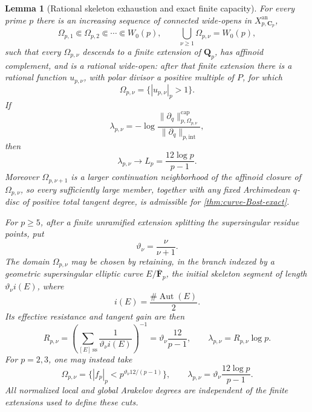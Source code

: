 \documentclass[11pt]{article}
\newtheorem{lemma}[lemma]{Lemma}
\theoremstyle{definition}
\theoremstyle{remark}
\newcommand{\Q}{\mathbf Q}
\newcommand{\C}{\mathbf C}
\newcommand{\F}{\mathbf F}
\begin{document}
\begin{lemma}[Rational skeleton exhaustion and exact finite capacity]
\label{lem:maximal-capacity-exhaustion}
For every prime $p$ there is an increasing sequence of connected wide-opens in
$X_{p,\C_p}^{\mathrm{an}}$,
\[
 \Omega_{p,1}\Subset\Omega_{p,2}\Subset\cdots\Subset W_0(p),
 \qquad \bigcup_{\nu\ge1}\Omega_{p,\nu}=W_0(p),
\]
such that every $\Omega_{p,\nu}$ descends to a finite extension of $\Q_p$,
has affinoid complement, and is a rational wide-open: after that finite
extension there is a rational function $u_{p,\nu}$, with polar divisor a
positive multiple of $P$, for which
\[
 \Omega_{p,\nu}=\{|u_{p,\nu}|_p>1\}.
\]
If
\begin{equation}\label{eq:inner-capacity-gain}
 \lambda_{p,\nu}=
 -\log\frac{\|\partial_q\|^{\mathrm{cap}}_{p,\Omega_{p,\nu}}}
              {\|\partial_q\|_{p,\mathrm{int}}},
\end{equation}
then
\begin{equation}\label{eq:inner-capacity-limit}
 \lambda_{p,\nu}\longrightarrow
 L_p=\frac{12\log p}{p-1}.
\end{equation}
Moreover $\Omega_{p,\nu+1}$ is a larger continuation neighborhood of the
affinoid closure of $\Omega_{p,\nu}$, so every sufficiently large member,
together with any fixed Archimedean $q$-disc of positive total tangent degree,
is admissible for \cref{thm:curve-Bost-exact}.

For $p\ge5$, after a finite unramified extension splitting the supersingular
residue points, put
\[
 \vartheta_\nu=\frac{\nu}{\nu+1}.
\]
The domain $\Omega_{p,\nu}$ may be chosen by retaining, in the branch indexed
by a geometric supersingular elliptic curve $E/\overline{\F}_p$, the initial
skeleton segment of length $\vartheta_\nu i(E)$, where
\[
 i(E)=\frac{\#\operatorname{Aut}(E)}2.
\]
Its effective resistance and tangent gain are then
\begin{equation}\label{eq:inner-resistance}
 R_{p,\nu}
 =\left(\sum_{[E]\ \mathrm{ss}}
       \frac1{\vartheta_\nu i(E)}\right)^{-1}
 =\vartheta_\nu\frac{12}{p-1},
 \qquad
 \lambda_{p,\nu}=R_{p,\nu}\log p.
\end{equation}
For $p=2,3$, one may instead take
\begin{equation}\label{eq:wild-inner-discs}
 \Omega_{p,\nu}
 =\{|f_p|_p<p^{\vartheta_\nu 12/(p-1)}\},
 \qquad
 \lambda_{p,\nu}
 =\vartheta_\nu\frac{12\log p}{p-1}.
\end{equation}
All normalized local and global Arakelov degrees are independent of the finite
extensions used to define these cuts.
\end{lemma}
\end{document}
